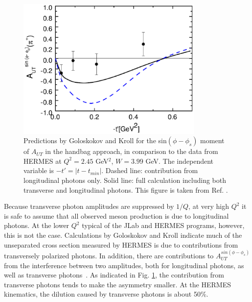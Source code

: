 \documentclass[preprint,superscriptaddress]{revtex4}
\begin{document}
\begin{figure}[hbt!]
\includegraphics[height=7cm]{hermes_Aut.eps}
\caption{\label{fig:hermes_aut}
Predictions by Goloskokov and Kroll for the sin$(\phi-\phi_s)$ moment of
$A_{UT}$ in the handbag approach, in comparison to the data from HERMES at
$Q^2=2.45$ GeV$^2$, $W=3.99$ GeV.  The independent variable is
$-t'=|t-t_{min}|$.  Dashed line: contribution from longitudinal photons only.
Solid line: full calculation including both transverse and longitudinal
photons.  This figure is taken from Ref. .}
\end{figure}

Because transverse photon amplitudes are suppressed by $1/Q$, at very high
$Q^2$ it is safe to assume that all observed meson production is due to
longitudinal photons.  At the lower $Q^2$ typical of the JLab and HERMES
programs, however, this is not the case.  Calculations by Goloskokov and Kroll
\cite{Go10} indicate much of the unseparated cross section measured by HERMES
\cite{hermes10} is due to contributions from transversely polarized photons.
In addition, there are contributions to $A_{UT}^{sin(\phi-\phi_s)}$ from the
interference between two amplitudes, both for longitudinal photons, as well as
transverse photons~\cite{Di05}.  As indicated in Fig. \ref{fig:hermes_aut}, the
contribution from transverse photons tends to make the asymmetry smaller.  At
the HERMES kinematics, the dilution caused by transverse photons is about
50\%.
\end{document}
